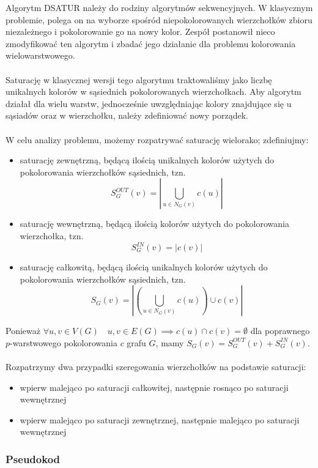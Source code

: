 \documentclass[10pt,a4paper]{article}
\begin{document}
	Algorytm DSATUR należy do rodziny algorytmów sekwencyjnych. W klasycznym problemie, polega on na wyborze spośród niepokolorowanych wierzchołków zbioru niezależnego i pokolorowanie go na nowy kolor. Zespół postanowił nieco zmodyfikować ten algorytm i zbadać jego działanie dla problemu kolorowania wielowarstwowego.
	\\~\\
	Saturację w klasycznej wersji tego algorytmu traktowaliśmy jako liczbę unikalnych kolorów w sąsiednich pokolorowanych wierzchołkach. Aby algorytm działał dla wielu warstw, jednocześnie uwzględniając kolory znajdujące się u sąsiadów oraz w wierzchołku, należy zdefiniować nowy porządek. 
	\\~\\
	W celu analizy problemu, możemy rozpatrywać saturację wielorako; zdefiniujmy:
	\begin{itemize}
		\item saturację zewnętrzną, będącą ilością unikalnych kolorów użytych do pokolorowania wierzchołków sąsiednich, tzn.
		\[S^{OUT}_{G}(v) = \left|\bigcup_{u \in N_{G}(v)} c(u)\right|\]
		\item saturację wewnętrzną, będącą ilością kolorów użytych do pokolorowania wierzchołka, tzn.
		\[S^{IN}_{G}(v) = |c(v)|\]
		\item saturację całkowitą, będącą ilością unikalnych kolorów użytych do pokolorowania wierzchołków sąsiednich, tzn.
		\[S_{G}(v) = \left|\left(\bigcup_{u \in N_{G}(v)} c(u) \right) \cup c(v)\right|\]
	\end{itemize}
	Ponieważ $\forall u,v \in V(G) \quad {u, v} \in E(G) \implies c(u) \cap c(v) = \emptyset$ dla poprawnego $p$-warstwowego pokolorowania $c$ grafu $G$, mamy $S_{G}(v) = S^{OUT}_{G}(v) + S^{IN}_{G}(v)$. 
	\\~\\
	Rozpatrzymy dwa przypadki szeregowania wierzchołków na podstawie saturacji:
	\begin{itemize}
		\item wpierw malejąco po saturacji całkowitej, następnie rosnąco po saturacji wewnętrznej
		\item wpierw malejąco po saturacji zewnętrznej, następnie malejąco po saturacji wewnętrznej
	\end{itemize}

	\subsubsection{Pseudokod}
\end{document}
